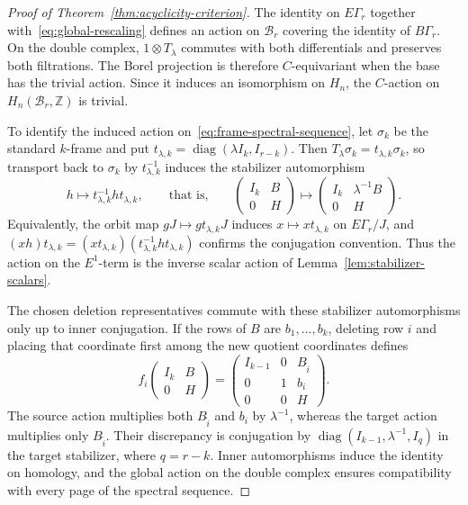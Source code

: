 \documentclass[11pt]{amsart}
\newcommand{\Z}{\mathbb Z}
\theoremstyle{definition}
\theoremstyle{remark}
\numberwithin{equation}{section}
\begin{document}
\begin{proof}[Proof of Theorem~\ref{thm:acyclicity-criterion}]
The identity on $E\Gamma_r$ together with~\eqref{eq:global-rescaling} defines an action on $\mathcal B_r$ covering the identity of $B\Gamma_r$. On the double complex, $1\otimes T_\lambda$ commutes with both differentials and preserves both filtrations. The Borel projection is therefore $C$-equivariant when the base has the trivial action. Since it induces an isomorphism on $H_n$, the $C$-action on $H_n(\mathcal B_r,\Z)$ is trivial.

To identify the induced action on~\eqref{eq:frame-spectral-sequence}, let $\sigma_k$ be the standard $k$-frame and put $t_{\lambda,k}=\operatorname{diag}(\lambda I_k,I_{r-k})$. Then $T_\lambda\sigma_k=t_{\lambda,k}\sigma_k$, so transport back to $\sigma_k$ by $t_{\lambda,k}^{-1}$ induces the stabilizer automorphism
$$
h\longmapsto t_{\lambda,k}^{-1}ht_{\lambda,k},\qquad\text{that is,}\qquad
 \begin{pmatrix}I_k&B\\0&H\end{pmatrix}
 \longmapsto\begin{pmatrix}I_k&\lambda^{-1}B\\0&H\end{pmatrix}.
$$
Equivalently, the orbit map $gJ\mapsto gt_{\lambda,k}J$ induces $x\mapsto xt_{\lambda,k}$ on $E\Gamma_r/J$, and $(xh)t_{\lambda,k}=(xt_{\lambda,k})(t_{\lambda,k}^{-1}ht_{\lambda,k})$ confirms the conjugation convention. Thus the action on the $E^1$-term is the inverse scalar action of Lemma~\ref{lem:stabilizer-scalars}.

The chosen deletion representatives commute with these stabilizer automorphisms only up to inner conjugation. If the rows of $B$ are $b_1,\ldots,b_k$, deleting row $i$ and placing that coordinate first among the new quotient coordinates defines
$$
f_i\begin{pmatrix}I_k&B\\0&H\end{pmatrix}
 =\begin{pmatrix}
 I_{k-1}&0&B_{\widehat i}\\
 0&1&b_i\\
 0&0&H
 \end{pmatrix}.
$$
The source action multiplies both $B_{\widehat i}$ and $b_i$ by $\lambda^{-1}$, whereas the target action multiplies only $B_{\widehat i}$. Their discrepancy is conjugation by $\operatorname{diag}(I_{k-1},\lambda^{-1},I_q)$ in the target stabilizer, where $q=r-k$. Inner automorphisms induce the identity on homology, and the global action on the double complex ensures compatibility with every page of the spectral sequence.


\end{proof}
\end{document}

